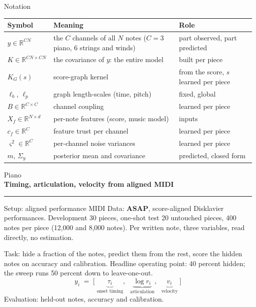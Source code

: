 \documentclass[aspectratio=169,11pt]{beamer}
\newcommand{\R}{\mathbb{R}}
\newcommand{\divider}[2]{\begin{frame}\centering\vfill
  {\small\textcolor{muted}{#1}}\\[2mm]
  {\LARGE\textbf{#2}}\\[4mm]
  {\color{okblue}\rule{62mm}{1.2pt}}\vfill\end{frame}}
\begin{document}
\begin{frame}{Notation}
  \begin{center}
  {\scriptsize\setlength{\tabcolsep}{3pt}
  \begin{tabular}{@{}lp{56mm}l@{}}
  \toprule
  Symbol & Meaning & Role \\
  \midrule
  $y \in \R^{CN}$ & the $C$ channels of all $N$ notes ($C{=}3$ piano, $6$ strings and winds) & part observed, part predicted \\
  $K \in \R^{CN \times CN}$ & the covariance of $y$: the entire model & built per piece \\
  $K_G(s)$ & score-graph kernel & from the score, $s$ learned per piece \\
  $\ell_b$, $\ell_p$ & graph length-scales (time, pitch) & fixed, global \\
  $B \in \R^{C \times C}$ & channel coupling & learned per piece \\
  $X_f \in \R^{N \times d}$ & per-note features (score, music model) & inputs \\
  $c_f \in \R^C$ & feature trust per channel & learned per piece \\
  $\varsigma^2 \in \R^C$ & per-channel noise variances & learned per piece \\
  $m$, $\Sigma_y$ & posterior mean and covariance & predicted, closed form \\
  \bottomrule
  \end{tabular}}
  \end{center}
\end{frame}



\divider{Piano}{Timing, articulation, velocity from aligned MIDI}

\begin{frame}{Setup: aligned performance MIDI}
  Data: \textbf{ASAP}, score-aligned Disklavier performances.
  Development 30 pieces, one-shot test 20 untouched pieces, 400 notes
  per piece (12{,}000 and 8{,}000 notes). Per written note, three
  variables, read directly, no estimation.
  \vspace{1mm}

  Task: hide a fraction of the notes, predict them from the rest, score
  the hidden notes on accuracy and calibration. Headline operating
  point: 40 percent hidden; the sweep runs 50 percent down to
  leave-one-out.
  \begin{equation*}
    y_i \;=\; \bigl[\;\underbrace{\tau_i}_{\text{onset timing}},\;\;
      \underbrace{\log r_i}_{\text{articulation}},\;\;
      \underbrace{v_i}_{\text{velocity}}\;\bigr]
  \end{equation*}
  \vfill
  Evaluation: held-out notes, accuracy and calibration.
\end{frame}
\end{document}
